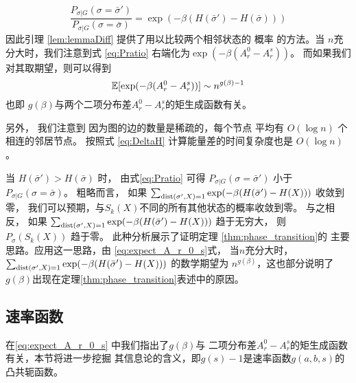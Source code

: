 \begin{equation}\label{eq:Pratio}
\frac{P_{\sigma |G } (\sigma = \bar{\sigma}')}{P_{\sigma |G } (\sigma = \bar{\sigma})}
= \exp(-\beta(H(\bar{\sigma}') - H(\bar{\sigma})))
\end{equation}
因此引理 \ref{lem:lemmaDiff} 提供了用以比较两个相邻状态的    概率
的方法。当 $n$充分大时，我们注意到式
\ref{eq:Pratio} 右端化为$\exp(-\beta (A_r^0 - A_r^s))$。
而如果我们对其取期望，则可以得到
\begin{equation}\label{eq:expect_A_r_0_s}
	\operatorname{\mathbb{E}}[\exp(-\beta (A_r^0 - A_r^s))] \sim n^{g(\beta)-1}
\end{equation}
也即 $g(\beta)$与两个二项分布差$A_r^0 - A_r^s$的矩生成函数有关。



另外， 我们注意到 因为图的边的数量是稀疏的，每个节点
平均有 $O(\log n)$ 个相连的邻居节点。
按照式 \eqref{eq:DeltaH} 
计算能量差的时间复杂度也是 $O(\log n)$。

当 $H(\bar{\sigma}') > H(\bar{\sigma})$ 时， 
由式\eqref{eq:Pratio} 可得
$P_{\sigma | G}(\sigma = \bar{\sigma}')$
小于
$P_{\sigma | G}(\sigma = \bar{\sigma})$。
粗略而言， 如果
$ \sum_{\operatorname{dist}(\sigma', X)=1}\exp(-\beta(H(\bar{\sigma}') - H(X))) $
收敛到零，
我们可以预期，与$S_k(X)$不同的所有其他状态的概率收敛到零。
与之相反， 如果
$ \sum_{\operatorname{dist}(\sigma', X)=1}\exp(-\beta(H(\bar{\sigma}') - H(X))) $
趋于无穷大，
则 $P_{\sigma}(S_k(X))$ 趋于零。
此种分析展示了证明定理 \ref{thm:phase_transition}的
主要思路。应用这一思路，由
\eqref{eq:expect_A_r_0_s}式，
当$n$充分大时，$ \sum_{\operatorname{dist}(\sigma', X)=1}\exp(-\beta(H(\bar{\sigma}') - H(X))) $
的数学期望为 $n^{g(\beta)}$，这也部分说明了
$g(\beta)$出现在定理\ref{thm:phase_transition}表述中的原因。
\subsection{速率函数}\label{sub:rate_function}
在\eqref{eq:expect_A_r_0_s} 中我们指出了$g(\beta)$与
二项分布差$A_r^0 - A_r^s$的矩生成函数有关，本节将进一步挖掘
其信息论的含义，即$g(s)-1$是速率函数$g(a,b,s)$的凸共轭函数。

